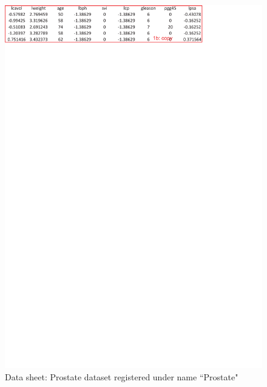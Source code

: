 \documentclass[article]{jss}
\begin{document}
\begin{figure}[!tbh]
          \includegraphics[width=\linewidth, keepaspectratio=true]{img/DataSheet_Prostate_body_markup}
          \centering{}\protect\caption{Data sheet: Prostate dataset registered under name ``Prostate"}\label{fig:DataSheet_Prostate}
        \end{figure} 
\end{document}
